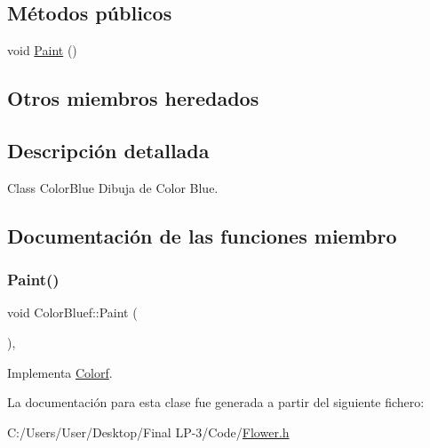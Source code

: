 \subsection*{Métodos públicos}
\begin{DoxyCompactItemize}
\item 
void \mbox{\hyperlink{class_color_bluef_aa33bd4c455b8fb31daf35b7c41b01bd1}{Paint}} ()
\end{DoxyCompactItemize}
\subsection*{Otros miembros heredados}


\subsection{Descripción detallada}
Class Color\+Blue Dibuja de Color Blue. 

\subsection{Documentación de las funciones miembro}
\mbox{\label{class_color_bluef_aa33bd4c455b8fb31daf35b7c41b01bd1}} 
\subsubsection{\texorpdfstring{Paint()}{Paint()}}
{\footnotesize\ttfamily void Color\+Bluef\+::\+Paint (\begin{DoxyParamCaption}{ }\end{DoxyParamCaption})\hspace{0.3cm}{\ttfamily [inline]}, {\ttfamily [virtual]}}



Implementa \mbox{\hyperlink{class_colorf_a0f98347b94d26eec7f53b33f71c10a66}{Colorf}}.



La documentación para esta clase fue generada a partir del siguiente fichero\+:\begin{DoxyCompactItemize}
\item 
C\+:/\+Users/\+User/\+Desktop/\+Final L\+P-\/3/\+Code/\mbox{\hyperlink{_flower_8h}{Flower.\+h}}\end{DoxyCompactItemize}
